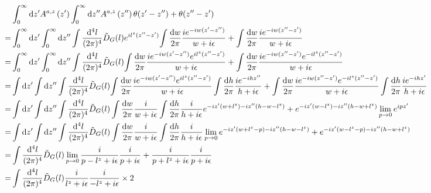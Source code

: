 \documentclass{article}
\DeclarePairedDelimiter\bracketM{[}{]}
\let\bqty\relax
\newcommand{\bqty}[1]{\bracketM*{#1}}
\newcommand{\mm}[1]{\frac{\dd^4#1}{(2\pi)^4}}
\begin{document}
\begin{align*}
	  & \int_{0}^{\infty} \dd z{'} A^{a,z}\left(z{'}\right) \int_{0}^{\infty} \dd z{''} A^{a,z}\left(z{''}\right) \bqty{\theta(z'-z'')+\theta(z''-z')}                                                                                                                                                                                  \\
	= & \int_{0}^{\infty} \dd z{'} \int_{0}^{\infty} \dd z{''} \int\mm{l}\tilde D_G(l)e^{il^z(z''-z')} \bqty{\int\frac{\dd w}{2\pi}\frac{ie^{-iw(z'-z'') }}{w+i\epsilon}+\int\frac{\dd w}{2\pi}\frac{ie^{-iw(z''-z') }}{w+i\epsilon}}                                                                                                   \\
	= & \int_{0}^{\infty} \dd z{'} \int_{0}^{\infty} \dd z{''} \int\mm{l}\tilde D_G(l) \bqty{\int\frac{\dd w}{2\pi}\frac{ie^{-iw(z'-z'') }e^{il^z(z''-z')}}{w+i\epsilon}+\int\frac{\dd w}{2\pi}\frac{ie^{-iw(z''-z') }e^{-il^z(z''-z')}}{w+i\epsilon}}                                                                                  \\
	= & \int \dd z{'} \int \dd z{''} \int\mm{l}\tilde D_G(l) \bqty{\int\frac{\dd w}{2\pi}\frac{ie^{-iw(z'-z'') }e^{il^z(z''-z')}}{w+i\epsilon}\int\frac{\dd h}{2\pi}\frac{ie^{-ihz'' }}{h+i\epsilon}+\int\frac{\dd w}{2\pi}\frac{ie^{-iw(z''-z') }e^{-il^z(z''-z')}}{w+i\epsilon}\int\frac{\dd h}{2\pi}\frac{ie^{-ihz' }}{h+i\epsilon}} \\
	= & \int \dd z{'} \int \dd z{''} \int\mm{l}\tilde D_G(l) \int\frac{\dd w}{2\pi}\frac{i}{w+i\epsilon}\int\frac{\dd h}{2\pi}\frac{i}{h+i\epsilon}\bqty{e^{-iz'(w+l^z)-iz''(h-w-l^z)}+e^{-iz'(w-l^z)-iz''(h-w+l^z)}}\lim_{p\to0}e^{ipz'}                                                                                               \\
	= & \int \dd z{'} \int \dd z{''} \int\mm{l}\tilde D_G(l) \int\frac{\dd w}{2\pi}\frac{i}{w+i\epsilon}\int\frac{\dd h}{2\pi}\frac{i}{h+i\epsilon}\lim_{p\to0}\bqty{e^{-iz'(w+l^z-p)-iz''(h-w-l^z)}+e^{-iz'(w-l^z-p)-iz''(h-w+l^z)}}                                                                                                   \\
	= & \int\mm{l}\tilde D_G(l) \lim_{p\to0}\bqty{\frac{i}{p-l^z+i\epsilon}\frac{i}{p+i\epsilon}+\frac{i}{p+l^z+i\epsilon}\frac{i}{p+i\epsilon}}                                                                                                                                                                                        \\
	= & \int\mm{l}\tilde D_G(l) \frac{i}{l^z+i\epsilon}\frac{i}{-l^z+i\epsilon}\times 2
\end{align*}
\end{document}
